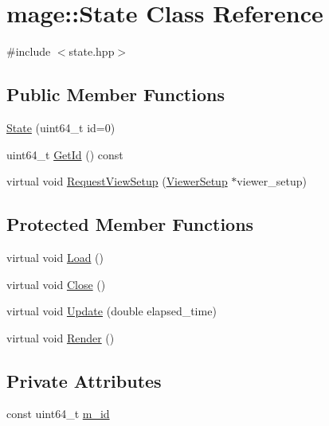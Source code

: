 \hypertarget{classmage_1_1_state}{}\section{mage\+:\+:State Class Reference}
\label{classmage_1_1_state}


{\ttfamily \#include $<$state.\+hpp$>$}

\subsection*{Public Member Functions}
\begin{DoxyCompactItemize}
\item 
\hyperlink{classmage_1_1_state_ac21bb6de22bb3b9c1b18d98b53e92100}{State} (uint64\+\_\+t id=0)
\item 
uint64\+\_\+t \hyperlink{classmage_1_1_state_a07c383a809204ba12a2bbfb22d2977d5}{Get\+Id} () const
\item 
virtual void \hyperlink{classmage_1_1_state_a352431f7b9c067bc45f922b782d6b407}{Request\+View\+Setup} (\hyperlink{structmage_1_1_viewer_setup}{Viewer\+Setup} $\ast$viewer\+\_\+setup)
\end{DoxyCompactItemize}
\subsection*{Protected Member Functions}
\begin{DoxyCompactItemize}
\item 
virtual void \hyperlink{classmage_1_1_state_aa88ace504c82ad372e5e599746f3ebda}{Load} ()
\item 
virtual void \hyperlink{classmage_1_1_state_a1edd5d756566f5b689c7a381f4e6b301}{Close} ()
\item 
virtual void \hyperlink{classmage_1_1_state_afbee8caa84e0c69ac5757f7e5e87317f}{Update} (double elapsed\+\_\+time)
\item 
virtual void \hyperlink{classmage_1_1_state_a6e3b3f55bfd5be86a02783a2f76c9709}{Render} ()
\end{DoxyCompactItemize}
\subsection*{Private Attributes}
\begin{DoxyCompactItemize}
\item 
const uint64\+\_\+t \hyperlink{classmage_1_1_state_ab135514ec2250e9680b35cfab4e91cab}{m\+\_\+id}
\end{DoxyCompactItemize}
